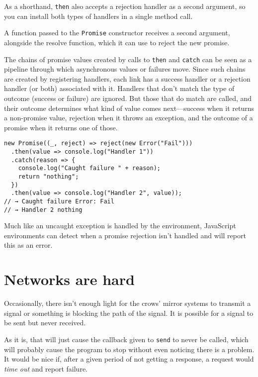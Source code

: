 As a shorthand, \lstinline`then` also accepts a rejection handler as a second argument, so you can install both types of handlers in a single method call.

A function passed to the \lstinline`Promise` constructor receives a second argument, alongside the resolve function, which it can use to reject the new promise.

The chains of promise values created by calls to \lstinline`then` and \lstinline`catch` can be seen as a pipeline through which asynchronous values or failures move. Since such chains are created by registering handlers, each link has a success handler or a rejection handler (or both) associated with it. Handlers that don't match the type of outcome (success or failure) are ignored. But those that do match are called, and their outcome determines what kind of value comes next—success when it returns a non-promise value, rejection when it throws an exception, and the outcome of a promise when it returns one of those.

\begin{lstlisting}
new Promise((_, reject) => reject(new Error("Fail")))
  .then(value => console.log("Handler 1"))
  .catch(reason => {
    console.log("Caught failure " + reason);
    return "nothing";
  })
  .then(value => console.log("Handler 2", value));
// → Caught failure Error: Fail
// → Handler 2 nothing
\end{lstlisting}
\noindent{}

Much like an uncaught exception is handled by the environment, JavaScript environments can detect when a promise rejection isn't handled and will report this as an error.

\section{Networks are hard}

Occasionally, there isn't enough light for the crows' mirror systems to transmit a signal or something is blocking the path of the signal. It is possible for a signal to be sent but never received.

As it is, that will just cause the callback given to \lstinline`send` to never be called, which will probably cause the program to stop without even noticing there is a problem. It would be nice if, after a given period of not getting a response, a request would \emph{time out} and report failure.

